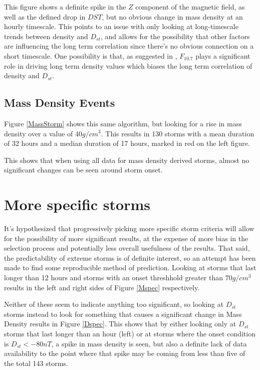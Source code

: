 \documentclass[10pt,twocolumn]{article}
\begin{document}
This figure shows a definite spike in the $Z$ component of the magnetic field, as well as the defined drop in $DST$, but no obvious change in mass density at an hourly timescale. This points to an issue with only looking at long-timescale trends between density and $D_{st}$, and allows for the possibility that other factors are influencing the long term correlation since there's no obvious connection on a short timescale. One possibility is that, as suggested in \cite{Takahashi2010}, $F_{10.7}$ plays a significant role in driving long term density values which biases the long term correlation of density and $D_{st}$.

\subsection{Mass Density Events}
Figure \ref{MassStorm} shows this same algorithm, but looking for a rise in mass density over a value of 40$g/cm^3$. This results in 130 storms with a mean duration of 32 hours and a median duration of 17 hours, marked in red on the left figure.



This shows that when using all data for mass density derived storms, almost no significant changes can be seen around storm onset.



\section{More specific storms}
It's hypothesized that progressively picking more specific storm criteria will allow for the possibility of more significant results, at the expense of more bias in the selection process and potentially less overall usefulness of the results. That said, the predictability of extreme storms is of definite interest, so an attempt has been made to find some reproducible method of prediction. Looking at storms that last longer than 12 hours and storms with an onset threshhold greater than $70g/cm^3$ results in the left and right sides of Figure \ref{Mspec} respectively.



Neither of these seem to indicate anything too significant, so looking at $D_{st}$ storms instead to look for something that causes a significant change in Mass Density results in Figure \ref{Dspec}. This shows that by either looking only at $D_{st}$ storms that last longer than an hour (left) or at storms where the onset condition is $D_{st}<-80nT$, a spike in mass density is seen, but also a definite lack of data availability to the point where that spike may be coming from less than five of the total 143 storms. 
\end{document}
